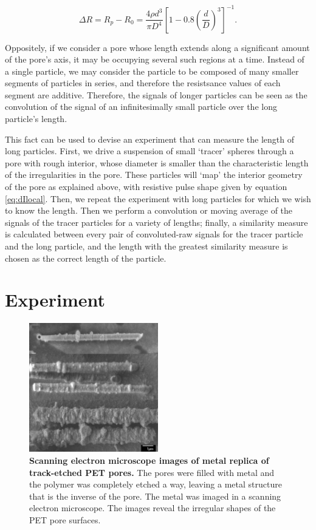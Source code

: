 		\begin{equation}\label{eq:dIlocal}
			\Delta R=R_{p}-R_{0}=\frac{4\rho d^{3}}{\pi D^{4}}\left[1-0.8\left(\frac{d}{D}\right)^{3}\right]^{-1}.
		\end{equation}

		
		Oppositely, if we consider a pore whose length extends along a significant amount of the pore's axis, it may be occupying several such regions at a time. Instead of a single particle, we may consider the particle to be composed of many smaller segments of particles in series, and therefore the resistsance values of each segment are additive. Therefore, the signals of longer particles can be seen as the convolution of the signal of an infinitesimally small particle over the long particle's length. 
		
		This fact can be used to devise an experiment that can measure the length of long particles. First, we drive a suspension of small `tracer' spheres through a pore with rough interior, whose diameter is smaller than the characteristic length of the irregularities in the pore. These particles will `map' the interior geometry of the pore as explained above, with resistive pulse shape given by equation \ref{eq:dIlocal}. Then, we repeat the experiment with long particles for which we wish to know the length. Then we perform a convolution or moving average of the signals of the tracer particles for a variety of lengths; finally, a similarity measure is calculated between every pair of convoluted-raw signals for the tracer particle and the long particle, and the length with the greatest similarity measure is chosen as the correct length of the particle. 
		
	\section{Experiment}
	    
		\begin{figure}
			\includegraphics[width=0.5\textwidth]{PET}
			\caption{\textbf{Scanning electron microscope images of metal replica of track-etched PET pores.} The pores were filled with metal and the polymer was completely etched a way, leaving a metal structure that is the inverse of the pore. The metal was imaged in a scanning electron microscope. The images reveal the irregular shapes of the PET pore surfaces.}

		\end{figure}
		
